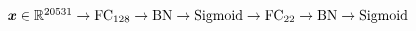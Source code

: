$\vect{x} \in \real^{20531}
	\newline \rightarrow \text{FC}_{128} \rightarrow \text{BN} \rightarrow \text{Sigmoid}
	\newline \rightarrow \text{FC}_{22} \rightarrow \text{BN} \rightarrow \text{Sigmoid}$